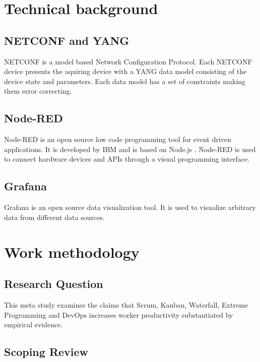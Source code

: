 \documentclass[12pt]{article}
\begin{document}
\section{Technical background}

\subsection{NETCONF and YANG}
NETCONF \cite{ennsNetworkConfigurationProtocol2011} is a model based Network Configuration Protocol.
Each NETCONF device presents the aquiring device with a YANG \cite{bjorklundYANG11Data2016} data model
consisting of the device state and parameters. 
Each data model has a set of constraints making them error correcting.

\subsection{Node-RED}
Node-RED \cite{LowcodeProgrammingEventdriven} is an open source low code programming tool for event driven applications.
It is developed by IBM and is based on Node.js \cite{NodejsRunJavaScript}.
Node-RED is used to connect hardware devices and APIs through a visual programming interface.

\subsection{Grafana}
Grafana \cite{GrafanaOpenComposable} is an open source data visualization tool.
It is used to visualize arbitrary data from different data sources.


\section{Work methodology}

\subsection{Research Question}
This meta study examines the claims that Scrum, Kanban, Waterfall, Extreme Programming and DevOps 
increases worker productivity substantiated by empirical evidence.

\subsection{Scoping Review}
\end{document}
